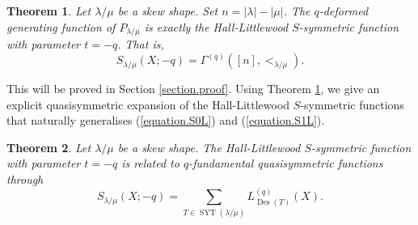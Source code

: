\documentclass[revision]{FPSAC2024}
\newtheorem{theorem}{Theorem}
\newcommand{\la}{\lambda}
\newcommand{\SYT}{\operatorname{SYT}}
\newcommand{\Des}{\operatorname{Des}}
\begin{document}
\begin{theorem}
\label{thm.SG}
Let $\lambda/\mu$ be a skew shape. Set $n = |\la| - |\mu|$. The $q$-deformed generating function of $P_{\lambda/\mu}$ is exactly the Hall-Littlewood $S$-symmetric function with parameter $t=-q$.
That is,
\begin{equation}
S_{\la/\mu}(X;-q) = \Gamma^{(q)}([n],<_{\la/\mu}).
\end{equation}
\end{theorem}

%
\noindent This will be proved in Section \ref{section.proof}. Using Theorem \ref{thm.SG}, we give an explicit quasisymmetric expansion of the Hall-Littlewood $S$-symmetric functions that naturally generalises (\ref{equation.S0L}) and (\ref{equation.S1L}).
%

\begin{theorem}
\label{thm.SL}
Let $\lambda/\mu$ be a skew shape. The Hall-Littlewood $S$-symmetric function with parameter $t=-q$ is related to $q$-fundamental quasisymmetric functions through
\begin{equation}
S_{\la/\mu}(X;-q) = \sum_{T \in \SYT(\la/\mu)}L^{(q)}_{\Des(T)}(X).
\end{equation}
\end{theorem}

%
\end{document}
